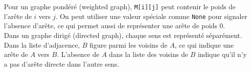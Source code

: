 \begin{Exercice}[10 minutes]  [Python]
\begin{solution}
    Pour un graphe pondéré (weighted graph), \lstinline{M[i][j]} peut contenir le poids de l'arête de $i$ vers $j$. On peut utiliser une valeur spéciale comme \lstinline{None} pour signaler l'absence d'arête, ce qui permet aussi de représenter une arête de poids $0$. \\

    Dans un graphe dirigé (directed graph), chaque sens est représenté séparément. Dans la liste d'adjacence, $B$ figure parmi les voisins de $A$, ce qui indique une arête de $A$ vers $B$. L'absence de $A$ dans la liste des voisins de $B$ indique qu'il n'y a pas d'arête directe dans l'autre sens.

    \end{solution}

\end{Exercice}


